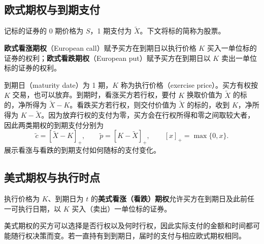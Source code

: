 \subsection{欧式期权与到期支付}
记标的证券的 0 期价格为 $S$，1 期支付为 $\tilde X$。下文将标的简称为股票。
\begin{tcolorbox}[knowledge]
\textbf{欧式看涨期权}（European call）赋予买方在到期日以执行价格 $K$ 买入一单位标的证券的权利；\textbf{欧式看跌期权}（European put）赋予买方在到期日以 $K$ 卖出一单位标的证券的权利。
\end{tcolorbox}
到期日（maturity date）为 1 期，$K$ 称为执行价格（exercise price）。买方有权按 $K$ 交易，也可以放弃。到期时，看涨买方若行权，要付 $K$ 换取价值为 $\tilde X$ 的标的，净所得为 $\tilde X-K$。看跌买方若行权，则交付价值为 $\tilde X$ 的标的，收到 $K$，净所得为 $K-\tilde X$。因为放弃行权的支付为零，买方会在行权所得和零之间取较大者，因此两类期权的到期支付分别为
\begin{equation}
 \tilde c=[\tilde X-K]_+,\qquad \tilde p=[K-\tilde X]_+,
 \qquad [x]_+=\max\{0,x\}.
 \label{eq:wj-five-1}
\end{equation}
 展示看涨与看跌的到期支付如何随标的支付变化。
\begin{center}
\begin{minipage}{\linewidth}
%
\centering
{}%
\end{minipage}
\end{center}

\subsection{美式期权与执行时点}
\begin{tcolorbox}[knowledge]
执行价格为 $K$、到期日为 $t$ 的\textbf{美式看涨（看跌）期权}允许买方在到期日及此前任一可执行日期，以 $K$ 买入（卖出）一单位标的证券。
\end{tcolorbox}
美式期权的买方可以选择是否行权以及何时行权，因此实际支付的金额和时间都可能随行权决策而变。若一直持有到到期日，届时的支付与相应欧式期权相同。

